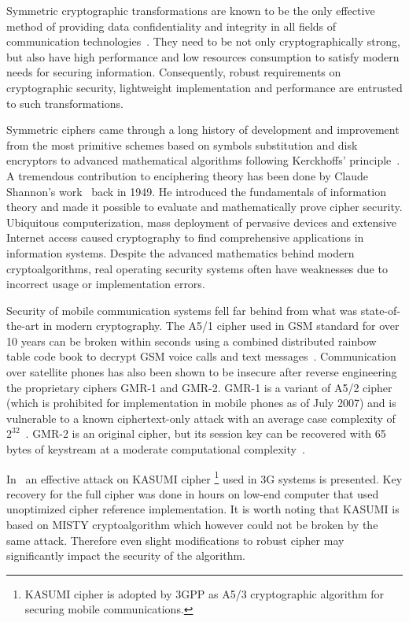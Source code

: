 
\label{sec:intro}

Symmetric cryptographic transformations are known to be the only effective 
method of providing data confidentiality and integrity in all fields of
communication technologies~\cite{moldovyan2007innovative}. They need to be not
only cryptographically strong, but also have high performance and low resources
consumption to satisfy modern needs for securing information. Consequently,
robust requirements on cryptographic security, lightweight implementation and
performance are entrusted to such transformations.

Symmetric ciphers came through a long history of development and improvement
from the most primitive schemes based on symbols substitution and disk
encryptors to advanced mathematical algorithms following Kerckhoffs'
principle~\cite{kahn1996codebreakers}.
A tremendous contribution to enciphering theory has been done by Claude
Shannon's work~\cite{shannon:secrecy} back in 1949. He introduced the
fundamentals of information theory and made it possible to evaluate and
mathematically prove cipher security. Ubiquitous computerization, mass
deployment of pervasive devices and extensive Internet access caused
cryptography to find comprehensive applications in information systems. Despite
the advanced mathematics behind modern cryptoalgorithms, real operating
security systems often have weaknesses due to incorrect usage or implementation
errors.

Security of mobile communication systems fell far behind from what was
state-of-the-art in modern cryptography. The A5/1 cipher used in GSM standard
for over 10 years can be broken within seconds using a combined distributed
rainbow table code book to decrypt GSM voice calls and text
messages~\cite{secproject}.
Communication over satellite phones has also been shown to be insecure after
reverse engineering the proprietary ciphers \mbox{GMR-1} and \mbox{GMR-2}.
\mbox{GMR-1} is a variant of A5/2 cipher (which is prohibited for
implementation in mobile phones as of July 2007) and is vulnerable to a known
ciphertext-only attack with an average case complexity of
$2^{32}$~\cite{3gpp:a52:2007}.
\mbox{GMR-2} is an original cipher, but its session key can be recovered with
65 bytes of keystream at a moderate computational
complexity~\cite{kiyanchuk:zuc}. 

In~\cite{cryptoeprint-2010-013} an effective attack on KASUMI cipher
\footnote{KASUMI cipher is adopted by 3GPP as A5/3 cryptographic algorithm
for securing mobile communications.} 
used in 3G systems is presented. Key recovery for the full cipher was done in
hours on low-end computer that used unoptimized cipher reference implementation.
It is worth noting that KASUMI is based on MISTY cryptoalgorithm which however 
could not be broken by the same attack. Therefore even slight modifications to
robust cipher may significantly impact the security of the algorithm.

